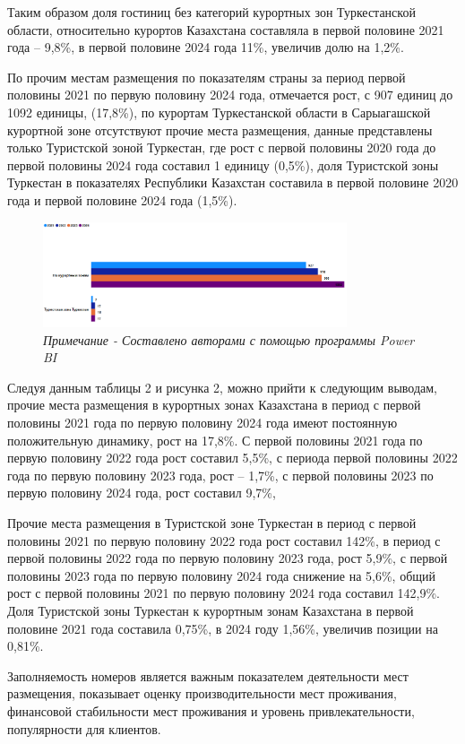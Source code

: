\begin{multicols}{2}
Таким образом доля гостиниц без категорий курортных зон Туркестанской
области, относительно курортов Казахстана составляла в первой половине
2021 года -- 9,8\%, в первой половине 2024 года 11\%, увеличив долю на
1,2\%.

По прочим местам размещения по показателям страны за период первой
половины 2021 по первую половину 2024 года, отмечается рост, с 907
единиц до 1092 единицы, (17,8\%), по курортам Туркестанской области в
Сарыагашской курортной зоне отсутствуют прочие места размещения, данные
представлены только Туристской зоной Туркестан, где рост с первой
половины 2020 года до первой половины 2024 года составил 1 единицу
(0,5\%), доля Туристской зоны Туркестан в показателях Республики
Казахстан составила в первой половине 2020 года и первой половине 2024
года (1,5\%).
\end{multicols}

\begin{figure}[H]
	\centering
	\includegraphics[width=0.8\textwidth]{media/ekon/image4}
	\caption*{Рис.2 - Прочие места размещения, единицы}
	\caption*{\normalfont\emph{Примечание - Составлено авторами с помощью программы Power BI}}
\end{figure}

\begin{multicols}{2}
Следуя данным таблицы 2 и рисунка 2, можно прийти к следующим выводам,
прочие места размещения в курортных зонах Казахстана в период с первой
половины 2021 года по первую половину 2024 года имеют постоянную
положительную динамику, рост на 17,8\%. С первой половины 2021 года по
первую половину 2022 года рост составил 5,5\%, с периода первой половины
2022 года по первую половину 2023 года, рост -- 1,7\%, с первой половины
2023 по первую половину 2024 года, рост составил 9,7\%,

Прочие места размещения в Туристской зоне Туркестан в период с первой
половины 2021 по первую половину 2022 года рост составил 142\%, в период
с первой половины 2022 года по первую половину 2023 года, рост 5,9\%, с
первой половины 2023 года по первую половину 2024 года снижение на
5,6\%, общий рост с первой половины 2021 по первую половину 2024 года
составил 142,9\%. Доля Туристской зоны Туркестан к курортным зонам
Казахстана в первой половине 2021 года составила 0,75\%, в 2024 году
1,56\%, увеличив позиции на 0,81\%.

Заполняемость номеров является важным показателем деятельности мест
размещения, показывает оценку производительности мест проживания,
финансовой стабильности мест проживания и уровень привлекательности,
популярности для клиентов.
\end{multicols}

